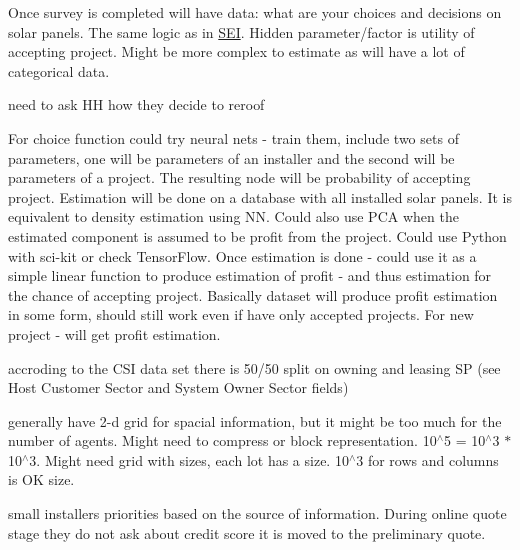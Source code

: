 
\begin{DoxyRefList}
\item[\label{wp__wp000001}%
\hypertarget{wp__wp000001}{}%
Class \hyperlink{classsolar__core_1_1_household}{solar\+\_\+core\+:\+:Household} ]Once survey is completed will have data\+: what are your choices and decisions on solar panels. The same logic as in \hyperlink{classsolar__core_1_1_s_e_i}{S\+E\+I}. Hidden parameter/factor is utility of accepting project. Might be more complex to estimate as will have a lot of categorical data. 
\item[\label{wp__wp000002}%
\hypertarget{wp__wp000002}{}%
Member \hyperlink{classsolar__core_1_1_household_aa63241ca3fcc1f2374d10b5c7f44124a}{solar\+\_\+core\+:\+:Household\+:\+:dec\+\_\+project\+\_\+reroof} (std\+::shared\+\_\+ptr$<$ P\+V\+Project $>$ project)]need to ask H\+H how they decide to reroof  
\item[\label{wp__wp000004}%
\hypertarget{wp__wp000004}{}%
Class \hyperlink{classsolar__core_1_1_s_e_i}{solar\+\_\+core\+:\+:S\+E\+I} ]For choice function could try neural nets -\/ train them, include two sets of parameters, one will be parameters of an installer and the second will be parameters of a project. The resulting node will be probability of accepting project. Estimation will be done on a database with all installed solar panels. It is equivalent to density estimation using N\+N. Could also use P\+C\+A when the estimated component is assumed to be profit from the project. Could use Python with sci-\/kit or check Tensor\+Flow. Once estimation is done -\/ could use it as a simple linear function to produce estimation of profit -\/ and thus estimation for the chance of accepting project. Basically dataset will produce profit estimation in some form, should still work even if have only accepted projects. For new project -\/ will get profit estimation.  
\item[\label{wp__wp000003}%
\hypertarget{wp__wp000003}{}%
Member \hyperlink{classsolar__core_1_1_s_e_i_a807561ad055ddc0df91b80ba406ee6df}{solar\+\_\+core\+:\+:S\+E\+I\+:\+:form\+\_\+design} (std\+::shared\+\_\+ptr$<$ P\+V\+Project $>$ project\+\_\+)]accroding to the C\+S\+I data set there is 50/50 split on owning and leasing S\+P (see Host Customer Sector and System Owner Sector fields) 
\item[\label{wp__wp000006}%
\hypertarget{wp__wp000006}{}%
Class \hyperlink{classsolar__core_1_1_world_map}{solar\+\_\+core\+:\+:World\+Map} ]generally have 2-\/d grid for spacial information, but it might be too much for the number of agents. Might need to compress or block representation. 10$^\wedge$5 = 10$^\wedge$3 $\ast$ 10$^\wedge$3. Might need grid with sizes, each lot has a size. 10$^\wedge$3 for rows and columns is O\+K size. 
\item[\label{wp__wp000008}%
\hypertarget{wp__wp000008}{}%
Member \hyperlink{classsolar__core_1_1_world_settings_a728f0b1c11f8ec1816d269aedc1cd80e}{solar\+\_\+core\+:\+:World\+Settings\+:\+:params\+\_\+to\+\_\+copy\+\_\+preliminary\+\_\+quote} ]small installers priorities based on the source of information. During online quote stage they do not ask about credit score it is moved to the preliminary quote. 
\end{DoxyRefList}